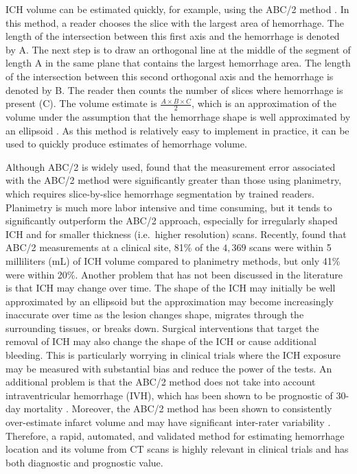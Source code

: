 \documentclass{elsarticle_nonatbib}\usepackage[]{graphicx}\usepackage[]{color}
\begin{document}
ICH volume can be estimated quickly, for example,  using the ABC/2 method \citep{broderick_volume_1993}.  In this method, a reader chooses the slice with the largest area of hemorrhage.  The length of the intersection between this first axis and the hemorrhage is denoted by A. The next step is to draw an orthogonal line  at the middle of the segment of length A in the same plane that contains the largest hemorrhage area. The length of the intersection between this second orthogonal axis and the hemorrhage is denoted by B.  The reader then counts the number of slices where hemorrhage is present (C).  The volume estimate is $\frac{A\times B\times C}{2}$, which is an approximation of the volume under the assumption that the hemorrhage shape is well approximated by an ellipsoid \citep{kothari_abcs_1996}.  As this method is relatively easy to implement in practice, it can be used to quickly produce estimates of hemorrhage volume. 

Although ABC/2 is widely used, \citet{divani_abcs_2011} found that the measurement error associated with the ABC/2 method were significantly greater than those using planimetry, which requires slice-by-slice hemorrhage segmentation by trained readers. Planimetry is much more labor intensive and time consuming, but it tends to significantly outperform the ABC/2 approach, especially for irregularly shaped ICH and for smaller thickness (i.e.~higher resolution) scans.  Recently, \citet{webb_accuracy_2015} found that ABC/2 measurements at a clinical site, 81\% of the $4,369$ scans were within 5 milliliters (mL) of ICH volume compared to planimetry methods, but only 41\% were within 20\%.   Another problem that has not been discussed in the literature is that ICH may change over time. The shape of the ICH may initially be well approximated by an ellipsoid but the approximation may become increasingly inaccurate over time as the lesion changes shape, migrates through the surrounding tissues, or breaks down.  Surgical interventions that target the removal of ICH may also change the shape of the ICH or cause additional bleeding. This is particularly worrying in clinical trials where the ICH exposure may be measured with substantial bias and reduce the power of the tests.  An additional problem is that the ABC/2 method does not take into account intraventricular hemorrhage (IVH), which has been shown to be prognostic of 30-day mortality \citep{hemphill_ich_2001, tuhrim_volume_1999}.  Moreover, the ABC/2 method has been shown to consistently over-estimate infarct volume \citep{pedraza_reliability_2012} and may have significant inter-rater variability \citep{hussein_reliability_2013}. Therefore, a rapid, automated, and validated method for estimating hemorrhage location and its volume from CT scans is highly relevant in clinical trials and has both diagnostic and prognostic value.
\end{document}
